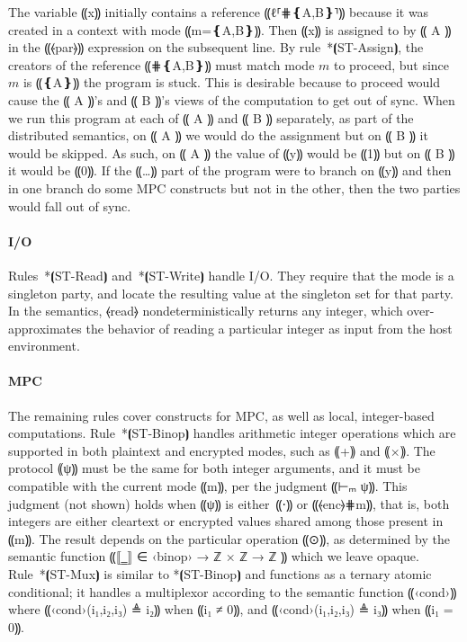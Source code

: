 The variable ⸨x⸩ initially contains a reference ⸨ℓ⸢⋕❴A,B❵⸣⸩ because it was
created in a context with mode ⸨m=❴A,B❵⸩. Then ⸨x⸩ is assigned to by
⸨ A ⸩ in the ⸨⦑par⦒⸩ expression on the subsequent line. By
rule~*⦗ST-Assign⦘, the creators of the reference ⸨⋕❴A,B❵⸩
must match mode $m$ to proceed, but since $m$ is ⸨❴A❵⸩ the program is stuck.
This is desirable because to proceed would cause the ⸨ A ⸩'s and ⸨ B ⸩'s views
of the computation to get out of sync. When we run this program at each of ⸨ A ⸩ and
⸨ B ⸩ separately, as part of the distributed semantics, on ⸨ A ⸩ we would do the assignment but on
⸨ B ⸩ it would be skipped. As such, on ⸨ A ⸩ the value of ⸨y⸩ would be ⸨1⸩ but on
⸨ B ⸩ it would be ⸨0⸩. If the ⸨…⸩ part of the program were to branch on ⸨y⸩ and
then in one branch do some MPC constructs but not in the other, then the two
parties would fall out of sync.

\paragraph*{I/O}

Rules~*⦗ST-Read⦘ and~*⦗ST-Write⦘ handle I/O. They require that the mode is a
singleton party, and locate the resulting value at the singleton set for that party.
In the semantics, ⦑read⦒ nondeterministically returns any integer,
which over-approximates the behavior of reading a particular integer as input
from the host environment.

\paragraph*{MPC}

The remaining rules cover constructs for MPC, as well as local,
integer-based computations.
%
Rule~*⦗ST-Binop⦘ handles arithmetic integer operations which are supported in
both plaintext and encrypted modes, such as ⸨+⸩ and ⸨×⸩. The protocol
⸨ψ⸩ must be the same for both integer arguments, and it must be compatible with the
current mode ⸨m⸩, per the judgment ⸨⊢ₘ ψ⸩. This judgment (not shown) holds when ⸨ψ⸩ is
either~⸨⋅⸩ or ⸨⦑enc⦒⋕m⸩, that is, both integers are either cleartext or
encrypted values shared among those present in ⸨m⸩. The result depends on the
particular operation ⸨⊙⸩, as determined by the semantic function ⸨⟦‗⟧ ∈ ‹binop›
→ ℤ × ℤ → ℤ ⸩ which we leave opaque.
Rule~*⦗ST-Mux⦘ is similar to *⦗ST-Binop⦘ and functions as a ternary atomic
conditional; it handles a multiplexor according to the semantic function
⸨‹cond›⸩ where ⸨‹cond›(i₁,i₂,i₃) ≜ i₂⸩ when ⸨i₁ ≠ 0⸩, and ⸨‹cond›(i₁,i₂,i₃) ≜ i₃⸩
when ⸨i₁ = 0⸩.

